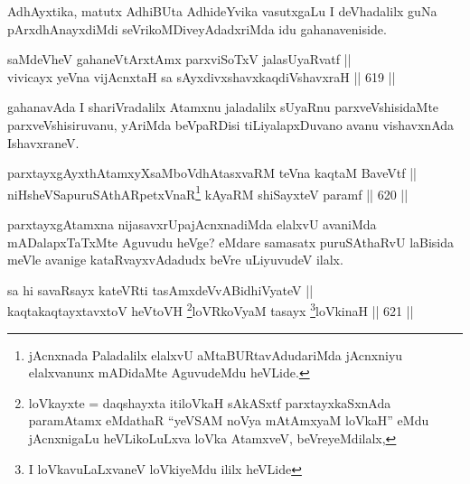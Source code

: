 \begin{artha}
AdhAyxtika, matutx AdhiBUta AdhideYvika vasutxgaLu I deVhadalilx guNa pArxdhAnayxdiMdi seVrikoMDiveyAdadxriMda idu gahanaveniside.
\end{artha}


\begin{shl}
saMdeVheV gahaneV\s tArx\s \s tAmx parxviSoTxV jalasUyaRvatf || \\
vivicayx yeVna vijAcnxtaH sa sAyxdivxshavxkaqdiVshavxraH \hfill || 619 ||  
\end{shl}

\begin{artha}
gahanavAda I shariVradalilx Atamxnu jaladalilx sUyaRnu parxveVshisidaMte parxveVshisiruvanu, yAriMda beVpaRDisi tiLiyalapxDuvano avanu vishavxnAda IshavxraneV.
\end{artha}


\begin{shl}
parxtayxgAyxthAtamxyXsaMboVdhAtasxvaRM teVna kaqtaM BaveVtf || \\
niHsheVSapuruSAthARpetxVnaR\footnote{jAcnxnada Paladalilx elalxvU aMtaBURtavAdudariMda jAcnxniyu
elalxvanunx mADidaMte AguvudeMdu heVLide.} kAyaRM shiSayxteV paramf \hfill || 620 ||  
\end{shl}


\begin{artha}
parxtayxgAtamxna nijasavxrUpajAcnxnadiMda elalxvU avaniMda mADalapxTaTxMte Aguvudu heVge? eMdare samasatx puruSAthaRvU laBisida meVle avanige kataRvayxvAdadudx beVre uLiyuvudeV ilalx.
\end{artha}


\begin{shl}
sa hi savaRsayx kateVRti tasAmxdeVvABidhiVyateV || \\
kaqtakaqtayxtavxtoV heVtoVH \footnote{loVkayxte = daqshayxta itiloVkaH sAkASxtf parxtayxkaSxnAda
paramAtamx eMdathaR ``yeVSAM noV\s ya mAtAmxyaM loVkaH'' eMdu jAcnxnigaLu heVLikoLuLxva loVka
AtamxveV, beVreyeMdilalx,}loVRkoV\s yaM tasayx \footnote{I loVkavuLaLxvaneV loVkiyeMdu ililx heVLide}loVkinaH \hfill || 621 ||  
\end{shl}



